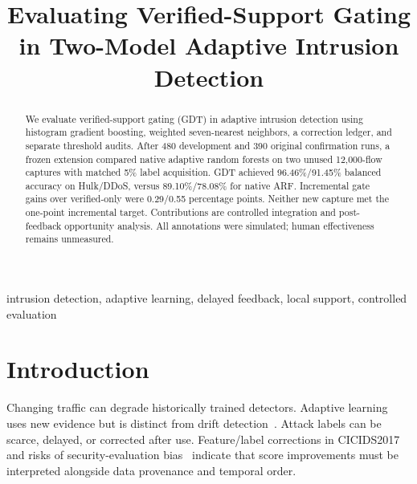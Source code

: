 \documentclass[conference]{IEEEtran}
\begin{document}
\title{Evaluating Verified-Support Gating in Two-Model Adaptive Intrusion Detection}
\author{
\and
{}
}
\maketitle
\begin{abstract}
We evaluate verified-support gating (GDT) in adaptive intrusion detection using histogram gradient boosting, weighted seven-nearest neighbors, a correction ledger, and separate threshold audits. After 480 development and 390 original confirmation runs, a frozen extension compared native adaptive random forests on two unused 12,000-flow captures with matched 5\% label acquisition. GDT achieved 96.46\%/91.45\% balanced accuracy on Hulk/DDoS, versus 89.10\%/78.08\% for native ARF. Incremental gate gains over verified-only were 0.29/0.55 percentage points. Neither new capture met the one-point incremental target. Contributions are controlled integration and post-feedback opportunity analysis. All annotations were simulated; human effectiveness remains unmeasured.
\end{abstract}
\begin{IEEEkeywords}
intrusion detection, adaptive learning, delayed feedback, local support, controlled evaluation
\end{IEEEkeywords}

\section{Introduction}
Changing traffic can degrade historically trained detectors. Adaptive learning uses new evidence but is distinct from drift detection~\cite{gama,lu}. Attack labels can be scarce, delayed, or corrected after use. Feature/label corrections in CICIDS2017~\cite{sharaf,engelen,liu} and risks of security-evaluation bias~\cite{arp,tesseract} indicate that score improvements must be interpreted alongside data provenance and temporal order.
\end{document}
